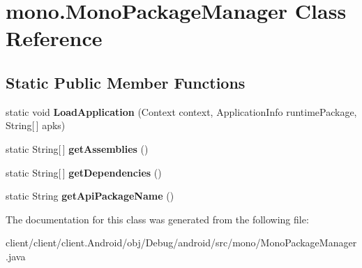 \hypertarget{classmono_1_1MonoPackageManager}{}\section{mono.\+Mono\+Package\+Manager Class Reference}
\label{classmono_1_1MonoPackageManager}
\subsection*{Static Public Member Functions}
\begin{DoxyCompactItemize}
\item 
\hypertarget{classmono_1_1MonoPackageManager_a5a2d5fc7f4891ab84e6deeae523686a2}{}static void {\bfseries Load\+Application} (Context context, Application\+Info runtime\+Package, String\mbox{[}$\,$\mbox{]} apks)\label{classmono_1_1MonoPackageManager_a5a2d5fc7f4891ab84e6deeae523686a2}

\item 
\hypertarget{classmono_1_1MonoPackageManager_a4db80b0afa9fab894e267e09bc3da334}{}static String\mbox{[}$\,$\mbox{]} {\bfseries get\+Assemblies} ()\label{classmono_1_1MonoPackageManager_a4db80b0afa9fab894e267e09bc3da334}

\item 
\hypertarget{classmono_1_1MonoPackageManager_a708931514353feff12f2cc9d99865a9e}{}static String\mbox{[}$\,$\mbox{]} {\bfseries get\+Dependencies} ()\label{classmono_1_1MonoPackageManager_a708931514353feff12f2cc9d99865a9e}

\item 
\hypertarget{classmono_1_1MonoPackageManager_a009d16dedf56862f4a23ee05e180e028}{}static String {\bfseries get\+Api\+Package\+Name} ()\label{classmono_1_1MonoPackageManager_a009d16dedf56862f4a23ee05e180e028}

\end{DoxyCompactItemize}


The documentation for this class was generated from the following file\+:\begin{DoxyCompactItemize}
\item 
client/client/client.\+Android/obj/\+Debug/android/src/mono/Mono\+Package\+Manager.\+java\end{DoxyCompactItemize}
